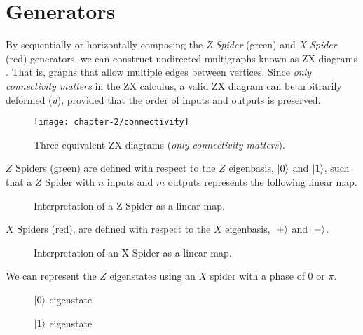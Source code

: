 \section{Generators}

By sequentially or horizontally composing the \textit{Z Spider} (green) and \textit{X Spider} (red) generators, we can construct undirected multigraphs known as ZX diagrams \cite{Wetering2020}. That is, graphs that allow multiple edges between vertices. Since \textit{only connectivity matters} in the ZX calculus, a valid ZX diagram can be arbitrarily deformed (\textit{d}), provided that the order of inputs and outputs is preserved.

\begin{figure}[H]
\centering
    \centering
    \texttt{[image: chapter-2/connectivity]}
    \caption{Three equivalent ZX diagrams (\textit{only connectivity matters}).}
    \label{only-connectivity-matters}
\end{figure}


$Z$ Spiders (green) are defined with respect to the $Z$ eigenbasis, $\ket 0$ and $\ket 1$, such that a $Z$ Spider with $n$ inputs and $m$ outputs represents the following linear map.

\begin{figure}[H]
\centering
{}
\caption{Interpretation of a Z Spider as a linear map.}
\end{figure}

$X$ Spiders (red), are defined with respect to the $X$ eigenbasis, $\ket +$ and $\ket -$.

\begin{figure}[H]
\centering
{}
\caption{Interpretation of an X Spider as a linear map.}
\end{figure}

We can represent the $Z$ eigenstates using an $X$ spider with a phase of $0$ or $\pi$.

\begin{figure}[H]
\centering
\begin{minipage}{.4\textwidth}
    \centering
    \caption{$\ket 0$ eigenstate}
\end{minipage}%
\begin{minipage}{.4\textwidth}
    \centering
    \caption{$\ket 1$ eigenstate}
\end{minipage}
\end{figure}


